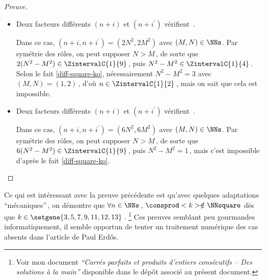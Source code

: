 \begin{proof}[Preuve]
\begin{itemize}
    	\medskip
		\item Deux facteurs différents $(n+i)$ et $(n+i^\prime)$ vérifient \,.
		
		\smallskip
		\noindent
		Dans ce cas, $(n+i, n+i^\prime) = (2 N^2, 2 M^2)$ avec $(M, N) \in \NNs$.
		Par symétrie des rôles, on peut supposer $N > M$\,, de sorte que $2(N^2 - M^2) \in \ZintervalC{1}{9}$\,, puis $N^2 - M^2 \in \ZintervalC{1}{4}$\,. 
		Selon le fait \ref{diff-square-ko}, nécessairement $N^2 - M^2 = 3$ avec $(M, N) = (1, 2)$\,, d'où $n \in \ZintervalC{1}{2}$\,, mais on sait que cela est impossible.


    	\medskip
		\item Deux facteurs différents $(n+i)$ et $(n+i^\prime)$ vérifient \,.
		
		\smallskip
		\noindent
		Dans ce cas, $(n+i, n+i^\prime) = (6 N^2, 6 M^2)$ avec $(M, N) \in \NNs$.
		Par symétrie des rôles, on peut supposer $N > M$\,, de sorte que $6(N^2 - M^2) \in \ZintervalC{1}{9}$\,, puis $N^2 - M^2 = 1$\,, mais c'est impossible d'après le fait \ref{diff-square-ko}.
		\qedhere
    \end{itemize}
\end{proof}




Ce qui est intéressant avec la preuve précédente est qu'avec quelques adaptations \enquote{mécaniques}\,, on démontre que $\forall n \in \NNs$\,, $\consprod<k> \notin \NNsquare$ dès que $k \in \setgene{3, 5, 7, 9, 11, 12, 13}$\,.
\footnote{
	Voir mon document \emph{\enquote{Carrés parfaits et produits d'entiers consécutifs -- Des solutions à la main}} disponible dans le dépôt associé au présent document.
}
Ces preuves semblant peu gourmandes informatiquement, il semble opportun de tenter un traitement numérique des cas absents dans l'article de Paul Erdős. 

